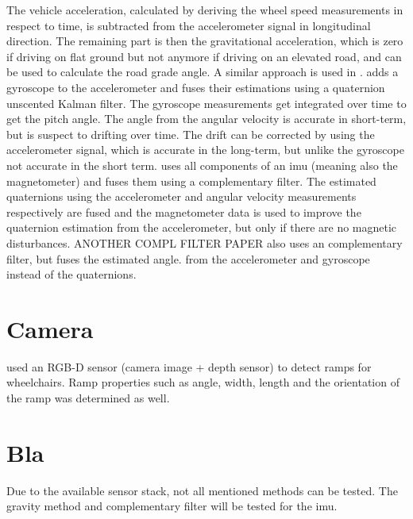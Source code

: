 The vehicle acceleration, calculated by deriving the wheel speed measurements in respect to time, is subtracted from the accelerometer signal in longitudinal direction.
The remaining part is then the gravitational acceleration, which is zero if driving on flat ground but not anymore if driving on an elevated road, and can be used to calculate the road grade angle.
A similar approach is used in \cite{Sentouh2008}.
\cite{He2020} adds a gyroscope to the accelerometer and fuses their estimations using a quaternion unscented Kalman filter.
The gyroscope measurements get integrated over time to get the pitch angle.
The angle from the angular velocity is accurate in short-term, but is suspect to drifting over time.
The drift can be corrected by using the accelerometer signal, which is accurate in the long-term, but unlike the gyroscope not accurate in the short term.
\cite{Wu2016} uses all components of an \gls{imu} (meaning also the magnetometer) and fuses them using a complementary filter.
The estimated quaternions using the accelerometer and angular velocity measurements respectively are fused and the magnetometer data is used to improve the quaternion estimation from the accelerometer, but only if there are no magnetic disturbances.
ANOTHER COMPL FILTER PAPER also uses an complementary filter, but fuses the estimated angle. from the accelerometer and gyroscope instead of the quaternions.



\section{}



\section{Camera}
\cite{Nejati2016} used an RGB-D sensor (camera image + depth sensor) to detect ramps for wheelchairs.
Ramp properties such as angle, width, length and the orientation of the ramp was determined as well.



\section{Bla}
Due to the available sensor stack, not all mentioned methods can be tested.
The gravity method and complementary filter will be tested for the \gls{imu}.

